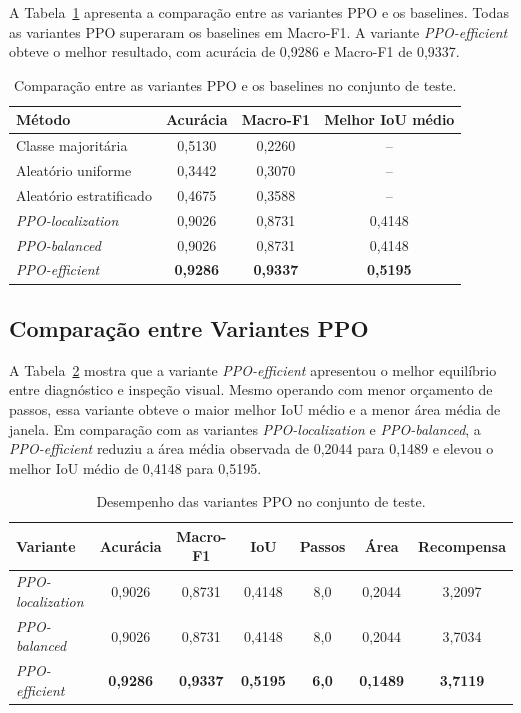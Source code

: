 A Tabela~\ref{tab:ppo_baselines} apresenta a comparação entre as variantes PPO e os
baselines. Todas as variantes PPO superaram os baselines em Macro-F1. A variante
\textit{PPO-efficient} obteve o melhor resultado, com acurácia de 0,9286 e Macro-F1 de
0,9337.

\begin{table}[htbp]
\centering
\caption{Comparação entre as variantes PPO e os baselines no conjunto de teste.}
\label{tab:ppo_baselines}
\begin{tabular}{lccc}
\hline
\textbf{Método} & \textbf{Acurácia} & \textbf{Macro-F1} & \textbf{Melhor IoU médio} \\
\hline
Classe majoritária & 0,5130 & 0,2260 & -- \\
Aleatório uniforme & 0,3442 & 0,3070 & -- \\
Aleatório estratificado & 0,4675 & 0,3588 & -- \\
\textit{PPO-localization} & 0,9026 & 0,8731 & 0,4148 \\
\textit{PPO-balanced} & 0,9026 & 0,8731 & 0,4148 \\
\textit{PPO-efficient} & \textbf{0,9286} & \textbf{0,9337} & \textbf{0,5195} \\
\hline
\end{tabular}
\end{table}

\subsection{Comparação entre Variantes PPO}

A Tabela~\ref{tab:ppo_results} mostra que a variante \textit{PPO-efficient} apresentou
o melhor equilíbrio entre diagnóstico e inspeção visual. Mesmo operando com menor
orçamento de passos, essa variante obteve o maior melhor IoU médio e a menor área média
de janela. Em comparação com as variantes \textit{PPO-localization} e
\textit{PPO-balanced}, a \textit{PPO-efficient} reduziu a área média observada de
0,2044 para 0,1489 e elevou o melhor IoU médio de 0,4148 para 0,5195.

\begin{table}[htbp]
\centering
\caption{Desempenho das variantes PPO no conjunto de teste.}
\label{tab:ppo_results}
\begin{tabular}{lcccccc}
\hline
\textbf{Variante} & \textbf{Acurácia} & \textbf{Macro-F1} & \textbf{IoU} & \textbf{Passos} & \textbf{Área} & \textbf{Recompensa} \\
\hline
\textit{PPO-localization} & 0,9026 & 0,8731 & 0,4148 & 8,0 & 0,2044 & 3,2097 \\
\textit{PPO-balanced} & 0,9026 & 0,8731 & 0,4148 & 8,0 & 0,2044 & 3,7034 \\
\textit{PPO-efficient} & \textbf{0,9286} & \textbf{0,9337} & \textbf{0,5195} & \textbf{6,0} & \textbf{0,1489} & \textbf{3,7119} \\
\hline
\end{tabular}
\end{table}

